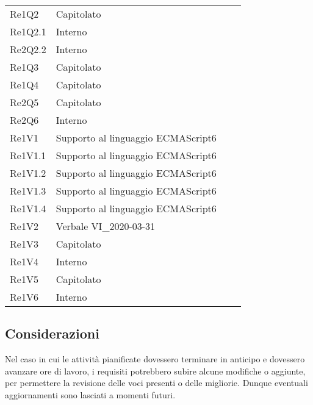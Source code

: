 \begin{longtable}{C{3cm} C{3cm} L{5.5cm} C{3cm}}
Re1Q2 & Capitolato\\
Re1Q2.1 & Interno\\
Re2Q2.2 & Interno\\
Re1Q3 & Capitolato\\
Re1Q4 & Capitolato\\
Re2Q5 & Capitolato\\
Re2Q6 & Interno\\
Re1V1 & Supporto al linguaggio ECMAScript6\\
Re1V1.1 & Supporto al linguaggio ECMAScript6\\
Re1V1.2 & Supporto al linguaggio ECMAScript6\\
Re1V1.3 & Supporto al linguaggio ECMAScript6\\
Re1V1.4 & Supporto al linguaggio ECMAScript6\\
Re1V2 & Verbale VI\_2020-03-31\\
Re1V3 & Capitolato\\
Re1V4 & Interno\\
Re1V5 & Capitolato\\
Re1V6 & Interno\\
\end{longtable}
	

	\subsection{Considerazioni}
Nel caso in cui le attività pianificate dovessero terminare in anticipo e dovessero avanzare ore di lavoro, i requisiti potrebbero subire alcune modifiche o aggiunte, per permettere la revisione delle voci presenti o delle migliorie. Dunque eventuali aggiornamenti sono lasciati a momenti
futuri.


